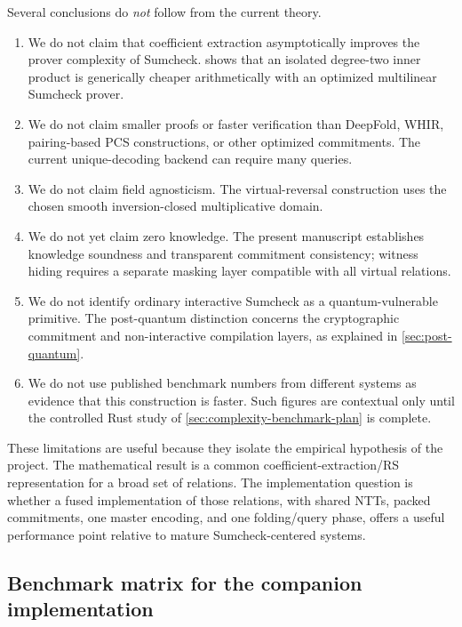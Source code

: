 Several conclusions do \emph{not} follow from the current theory.

\begin{enumerate}[label=(\roman*),leftmargin=*]
  \item We do not claim that coefficient extraction asymptotically improves the prover complexity of Sumcheck.   shows that an isolated degree-two inner product is generically cheaper arithmetically with an optimized multilinear Sumcheck prover.
  \item We do not claim smaller proofs or faster verification than DeepFold, WHIR, pairing-based PCS constructions, or other optimized commitments.  The current unique-decoding backend can require many queries.
  \item We do not claim field agnosticism.  The virtual-reversal construction uses the chosen smooth inversion-closed multiplicative domain.
  \item We do not yet claim zero knowledge.  The present manuscript establishes knowledge soundness and transparent commitment consistency; witness hiding requires a separate masking layer compatible with all virtual relations.
  \item We do not identify ordinary interactive Sumcheck as a quantum-vulnerable primitive.  The post-quantum distinction concerns the cryptographic commitment and non-interactive compilation layers, as explained in \cref{sec:post-quantum}.
  \item We do not use published benchmark numbers from different systems as evidence that this construction is faster.  Such figures are contextual only until the controlled Rust study of \cref{sec:complexity-benchmark-plan} is complete.
\end{enumerate}

These limitations are useful because they isolate the empirical hypothesis of the project.  The mathematical result is a common coefficient-extraction/RS representation for a broad set of relations.  The implementation question is whether a fused implementation of those relations, with shared NTTs, packed commitments, one master encoding, and one folding/query phase, offers a useful performance point relative to mature Sumcheck-centered systems.

\subsection{Benchmark matrix for the companion implementation}
\label{sec:comparison-benchmark-matrix}

